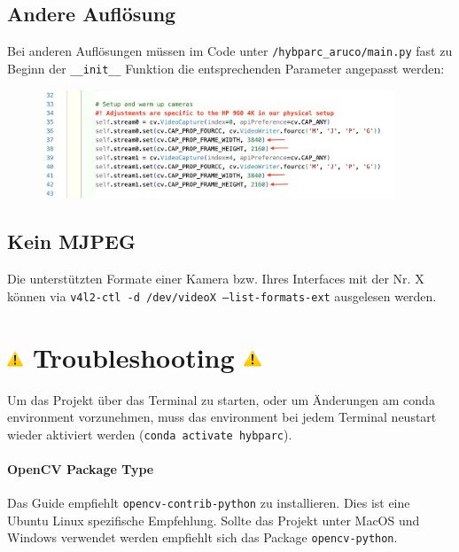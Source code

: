 \documentclass[a4paper]{article}
\newcommand{\code}[1]{\texttt{#1}}
\begin{document}
\subsection{Andere Auflösung}
\label{sec:custom-resolution}
Bei anderen Auflösungen müssen im Code unter \code{/hybparc\_aruco/main.py} fast zu Beginn der \code{\_\_init\_\_} Funktion die entsprechenden Parameter angepasst werden:
\begin{figure}[h]
    \centering
    \includegraphics[width=10.5cm]{stream_properties.png}
\end{figure}

\subsection{Kein MJPEG}
\label{ssec:the-mjpeg-problem}
Die unterstützten Formate einer Kamera bzw. Ihres Interfaces mit der Nr. X können via \code{v4l2-ctl -d /dev/videoX --list-formats-ext} ausgelesen werden. 


\section{\includegraphics[height=0.65em]{warning.png} Troubleshooting \includegraphics[height=0.7em]{warning.png}}
\label{sec:troubleshooting}

Um das Projekt über das Terminal zu starten, oder um Änderungen am conda environment vorzunehmen, muss das environment bei jedem Terminal neustart wieder aktiviert werden (\code{conda activate hybparc}).

\paragraph{OpenCV Package Type}
Das Guide empfiehlt \code{opencv-contrib-python} zu installieren. Dies ist eine Ubuntu Linux spezifische Empfehlung. Sollte das Projekt unter MacOS und Windows verwendet werden empfiehlt sich das Package \code{opencv-python}.
\end{document}
